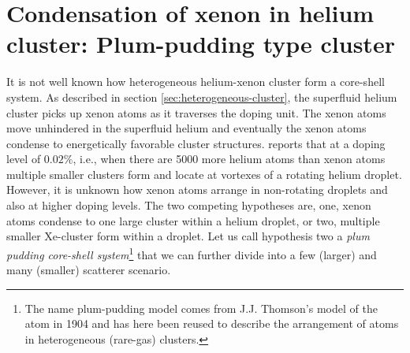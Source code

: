 \section{Condensation of xenon in helium cluster: Plum-pudding type cluster}\label{sec:helium-data}
It is not well known how heterogeneous helium-xenon cluster form a core-shell system. As described in section \ref{sec:heterogeneous-cluster}, the superfluid helium cluster picks up xenon atoms as it traverses the doping unit. The xenon atoms move unhindered in the superfluid helium and eventually the xenon atoms condense to energetically favorable cluster structures. \citep{Gomez-2014-Science} reports that at a doping level of $0.02\%$, i.e., when there are 5000 more helium atoms than xenon atoms multiple smaller clusters form and locate at vortexes of a rotating helium droplet. However, it is unknown how xenon atoms arrange in non-rotating droplets and also at higher doping levels. The two competing hypotheses are, one, xenon atoms condense to one large cluster within a helium droplet, or two, multiple smaller Xe-cluster form within a droplet. Let us call hypothesis two a \textit{plum pudding core-shell system}\footnote{The name plum-pudding model comes from J.J. Thomson's model of the atom in 1904 and has here been reused to describe the arrangement of atoms in heterogeneous (rare-gas) clusters.} that we can further divide into a few (larger) and many (smaller) scatterer scenario.\\
